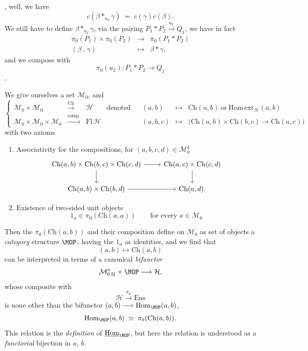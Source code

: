 , well, we have
\[
\boxed{\;c(\beta *_{u_2}\gamma) \;=\; c(\gamma)c(\beta).\;}
\]
We still have to define $\beta *_{u_2}\gamma$, via the pairing $P_1*P_2\xrightarrow{u_2}Q_1$, we have in fact
\[
\begin{array}{ccc}
\pi_0(P_1)\times\pi_0(P_2) & \longrightarrow & \pi_0(P_1*P_2)\\
(\beta\,,\,\gamma) & \longmapsto & \beta*\gamma,
\end{array}
\]
and we compose with
\[
\pi_0(u_2) : P_1*P_2 \longrightarrow Q_1
\]
.

We give ourselves a set $\mathcal{M}_0$, and
\[
\left\{
\begin{array}{rclccrcl}
\mathcal{M}_0\times\mathcal{M}_0 & \xrightarrow{\mathrm{Ch}} & \mathcal{H} & \text{denoted} & & (a,b) & \longmapsto & \mathrm{Ch}(a,b)\ \text{or}\ \mathrm{Hom\,ext}_{\mathcal{H}}(a,b)\\
\mathcal{M}_0\times\mathcal{M}_0\times\mathcal{M}_0 & \xrightarrow{\text{comp.}} & \mathrm{Fl}\,\mathcal{H} & & & (a,b,c) & \longmapsto & \bigl(\mathrm{Ch}(a,b)\times\mathrm{Ch}(b,c)\longrightarrow\mathrm{Ch}(a,c)\bigr)
\end{array}
\right.
\]
with two axioms

\begin{enumerate}
\item[a)] Associativity for the compositions, for $(a,b,c,d)\in\mathcal{M}_0^4$
\[
\begin{tikzcd}
\mathrm{Ch}(a,b)\times\mathrm{Ch}(b,c)\times\mathrm{Ch}(c,d) \arrow[r] \arrow[d] & \mathrm{Ch}(a,c)\times\mathrm{Ch}(c,d) \arrow[d]\\
\mathrm{Ch}(a,b)\times\mathrm{Ch}(b,d) \arrow[r] & \mathrm{Ch}(a,d).
\end{tikzcd}
\]
\item[b)] Existence of two-sided unit objects
\[
1_a\in\pi_0(\mathrm{Ch}(a,a)) \qquad \text{for every } a\in\mathcal{M}_0
\]
\end{enumerate}

Then the $\pi_0(\mathrm{Ch}(a,b))$ and their composition define on $\mathcal{M}_0$ as set of objects a \textit{category} structure $\MOP$, having the $1_a$ as identities, and we find that
\[
(a,b)\longmapsto\mathrm{Ch}(a,b)
\]
can be interpreted in terms of a canonical \textit{bifunctor}
\[
\mathcal{M}^o_{0\,\Pi}\times\MOP \longrightarrow \mathcal{H},
\]
whose composite with
\[
\mathcal{H}\xrightarrow{\pi_0}\mathrm{Ens}
\]
is none other than the bifunctor $(a,b)\longrightarrow\mathrm{Hom}_{\MOP}(a,b)$,
\[
\mathrm{Hom}_{\MOP}(a,b) \;\simeq\; \pi_0(\mathrm{Ch}(a,b)).
\]
This relation is the \textit{definition} of $\underline{\mathrm{Hom}}_{\MOP}$, but here the relation is understood as a %
\textit{functorial} bijection in $a$, $b$.

